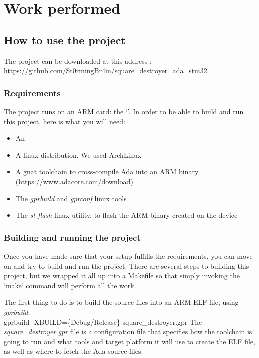 \section{Work performed}

\subsection{How to use the project}

\begin{noindent}
The project can be downloaded at this address : \\
\url{https://github.com/St0rmingBr4in/square_destroyer_ada_stm32}
\end{noindent}

\subsubsection{Requirements}

The project runs on an ARM card: the `\stmdb'. In order to be able to
build and run this project, here is what you will need:

\begin{itemize}
	\item An \stmdb
	\item A linux distribution. We used ArchLinux
    \item A gnat toolchain to cross-compile Ada into an ARM binary
		(\url{https://www.adacore.com/download})
	\item The \textit{gprbuild} and \textit{gprconf} linux tools
	\item The \textit{st-flash} linux utility, to flash the ARM binary created on the
		  device
\end{itemize}

\subsubsection{Building and running the project}

Once you have made sure that your setup fulfills the requirements, you can
move on and try to build and run the project. There are several steps to
building this project, but we wrapped it all up into a Makefile so that simply
invoking the `make` command will perform all the work.

The first thing to do is to build the source files into an ARM ELF file, using
\textit{gprbuild}:\\
gprbuild -XBUILD=\{Debug/Release\} square\_destroyer.gpr
The \textit{square\_destroyer.gpr} file is a configuration file that specifies
how the toolchain is going to run and what tools and target platform it will
use to create the ELF file, as well as where to fetch the Ada source files.

